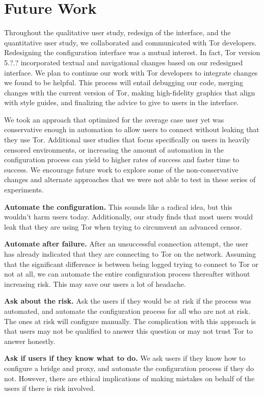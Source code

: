 \documentclass[USenglish,oneside,twocolumn]{article}
\begin{document}
\section{Future Work} 
Throughout the qualitative user study, redesign of the interface, and the quantitative user study, we collaborated and communicated with Tor developers. Redesigning the configuration interface was a mutual interest. In fact, Tor version {\color{red} 5.?.?} incorporated textual and navigational changes based on our redesigned interface. We plan to continue our work with Tor developers to integrate changes we found to be helpful. This process will entail debugging our code, merging changes with the current version of Tor, making high-fidelity graphics that align with style guides, and finalizing the advice to give to users in the interface. 

We took an approach that optimized for the average case user yet was conservative enough in automation to allow users to connect without leaking that they use Tor. Additional user studies that focus specifically on users in heavily censored environments, or increasing the amount of automation in the configuration process can yield to higher rates of success and faster time to success. We encourage future work to explore some of the non-conservative changes and alternate approaches that we were not able to test in these series of experiments.\\

\begin{description}
\item{\bfseries Automate the configuration.} This sounds like a radical idea, but this wouldn't harm users today. Additionally, our study finds that most users would leak that they are using Tor when trying to circumvent an advanced censor. 
\item {\bfseries Automate after failure.} After an unsuccessful connection attempt, the user has already indicated that they are connecting to Tor on the network. Assuming that the significant difference is between being logged trying to connect to Tor or not at all, we can automate the entire configuration process thereafter without increasing risk. This may save our users a lot of headache. 
\item{\bfseries Ask about the risk.} Ask the users if they would be at risk if the process was automated, and automate the configuration process for all who are not at risk. The ones at risk will configure manually. The complication with this approach is that users may not be qualified to answer this question or may not trust Tor to answer honestly. 
\item{\bfseries Ask if users if they know what to do.} We ask users if they know how to configure a bridge and proxy, and automate the configuration process if they do not. However, there are ethical implications of making mistakes on behalf of the users if there is risk involved. 
\end{description}
\end{document}
